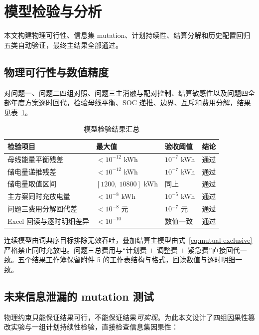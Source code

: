 \section{模型检验与分析}
\label{sec:validation}

本文构建物理可行性、信息集 mutation、计划持续性、结算分解和历史配置回归五类自动验证，最终主结果全部通过。

\subsection{物理可行性与数值精度}

对问题一、问题二四组对照、问题三主消融与配对控制、结算敏感性以及问题四全部年度方案逐时回代，检验母线平衡、SOC 递推、边界、互斥和费用分解，结果见表~\ref{tab:validation}。

\begin{table}[htbp]
	\caption{模型检验结果汇总}
	\label{tab:validation}
	\centering
	\begin{tabular}{l l l l}
		\toprule
		检验项目 & 最大值 & 验收阈值 & 结论 \\
		\midrule
		母线能量平衡残差 & $<10^{-12}$ kWh & $10^{-7}$ kWh & 通过 \\
		储电量递推残差 & $<10^{-12}$ kWh & $10^{-7}$ kWh & 通过 \\
		储电量取值区间 & $[1200,\ 10800]$ kWh & 同上 & 通过 \\
		主方案同时充放电量 & $<10^{-8}$ kWh & $10^{-5}$ kWh & 通过 \\
		问题三费用分解回代差 & $<10^{-8}$ 元 & $10^{-7}$ 元 & 通过 \\
		Excel 回读与逐时明细差异 & $<10^{-10}$ & 数值一致 & 通过 \\
		\bottomrule
	\end{tabular}
\end{table}

连续模型由词典序目标排除无效吞吐，叠加结算主模型由式~\eqref{eq:mutual-exclusive} 严格禁止同时充放电。问题三总费用与“计划费 $+$ 调整费 $+$ 紧急费”直接回代一致。五个结果工作簿保留附件 5 的工作表结构与格式，回读数值与逐时明细一致。

\subsection{未来信息泄漏的 mutation 测试}

物理约束只能保证结果可行，不能保证结果\emph{可实现}。为此本文设计了四组因果性篡改实验与一组计划持续性检验，直接检查信息集因果性：

